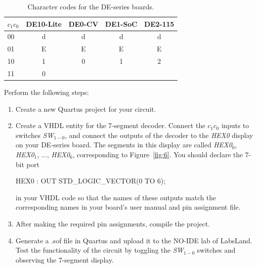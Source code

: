 \documentclass[epsfig,10pt,fullpage]{article}
\begin{document}
\begin{table}[H]
	\begin{center}
	\begin{tabular}{l | c | c | c | c}
	$c_1 c_0$ & DE10-Lite & DE0-CV & DE1-SoC & DE2-115 \\
	\hline
	{\rule[0mm]{0mm}{5mm}\hspace{0.75 mm} 00} & d & d & d & d \\
	\hspace{0.75 mm}
	01 & E & E & E & E \\
	\hspace{0.75 mm}
	10 & 1 & 0 & 1 & 2 \\
	\hspace{0.75 mm}
	11 & 0 & & & \\
	\end{tabular}
	\caption{Character codes for the DE-series boards.}
	\label{tab:codes}
	\end{center}
\end{table}

Perform the following steps:

\begin{enumerate}
\item Create a new Quartus project for your circuit.
\item Create a VHDL entity for the 7-segment decoder. Connect the $c_1 c_0$ inputs
to switches {\it SW}$_{1-0}$, and connect the outputs of the decoder to the {\it HEX0} 
display on your DE-series board. The segments in this display are called 
{\it HEX0}$_0$, {\it HEX0}$_1$, $\ldots$, {\it HEX0}$_6$, corresponding to  Figure~\ref{fig:6}.
You should declare the 7-bit port 

\begin{center}
\begin{minipage}[t]{12.5 cm}
\begin{tabbing}
HEX0 : OUT STD\_LOGIC\_VECTOR(0 TO 6);
\end{tabbing}
\end{minipage}
\end{center}

in your VHDL code so that the
names of these outputs match the corresponding names in your board's user manual and pin assignment file.
\item After making the required pin assignments, compile the project.
\item Generate a .sof file in Quartus and upload it to the NO-IDE lab of LabsLand. Test the functionality of the 
circuit by toggling the {\it SW}$_{1-0}$ switches and observing the 7-segment display.
\end{enumerate}
\end{document}
